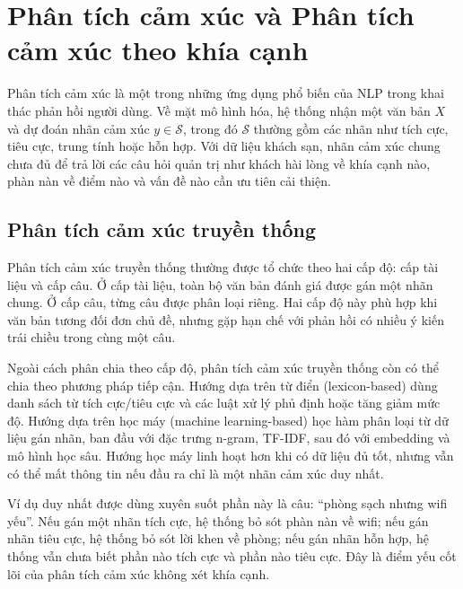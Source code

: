 \section{Phân tích cảm xúc và Phân tích cảm xúc theo khía cạnh}
\label{sec:chap2-absa}

Phân tích cảm xúc là một trong những ứng dụng phổ biến của NLP trong khai thác phản hồi người dùng. Về mặt mô hình hóa, hệ thống nhận một văn bản $X$ và dự đoán nhãn cảm xúc $y\in\mathcal{S}$, trong đó $\mathcal{S}$ thường gồm các nhãn như tích cực, tiêu cực, trung tính hoặc hỗn hợp. Với dữ liệu khách sạn, nhãn cảm xúc chung chưa đủ để trả lời các câu hỏi quản trị như khách hài lòng về khía cạnh nào, phàn nàn về điểm nào và vấn đề nào cần ưu tiên cải thiện.

\subsection{Phân tích cảm xúc truyền thống}
\label{subsec:chap2-traditional-cảm xúc}

Phân tích cảm xúc truyền thống thường được tổ chức theo hai cấp độ: cấp tài liệu và cấp câu. Ở cấp tài liệu, toàn bộ văn bản đánh giá được gán một nhãn chung. Ở cấp câu, từng câu được phân loại riêng. Hai cấp độ này phù hợp khi văn bản tương đối đơn chủ đề, nhưng gặp hạn chế với phản hồi có nhiều ý kiến trái chiều trong cùng một câu.

Ngoài cách phân chia theo cấp độ, phân tích cảm xúc truyền thống còn có thể chia theo phương pháp tiếp cận. Hướng dựa trên từ điển (lexicon-based) dùng danh sách từ tích cực/tiêu cực và các luật xử lý phủ định hoặc tăng giảm mức độ. Hướng dựa trên học máy (machine learning-based) học hàm phân loại từ dữ liệu gán nhãn, ban đầu với đặc trưng n-gram, TF-IDF, sau đó với embedding và mô hình học sâu. Hướng học máy linh hoạt hơn khi có dữ liệu đủ tốt, nhưng vẫn có thể mất thông tin nếu đầu ra chỉ là một nhãn cảm xúc duy nhất.

Ví dụ duy nhất được dùng xuyên suốt phần này là câu: ``phòng sạch nhưng wifi yếu''. Nếu gán một nhãn tích cực, hệ thống bỏ sót phàn nàn về wifi; nếu gán nhãn tiêu cực, hệ thống bỏ sót lời khen về phòng; nếu gán nhãn hỗn hợp, hệ thống vẫn chưa biết phần nào tích cực và phần nào tiêu cực. Đây là điểm yếu cốt lõi của phân tích cảm xúc không xét khía cạnh.

